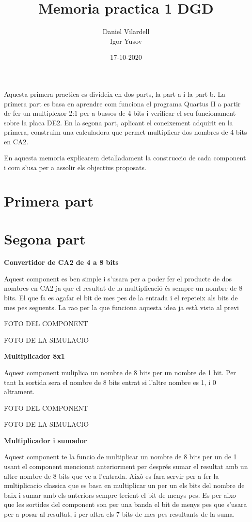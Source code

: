 \documentclass[12pt, a4papre]{article}
\author{Daniel Vilardell\\
	   Igor Yusov}
\title{Memoria practica 1 DGD}
\date{17-10-2020}
\begin{document}
	\maketitle
	Aquesta primera practica es divideix en dos parts, la part a i la part b. La primera part es basa en aprendre com funciona el programa Quartus II a partir de fer un multiplexor  2:1 per a bussos de 4 bits i verificar el seu funcionament sobre la placa DE2. En la segona part, aplicant el coneixement adquirit en la primera, construim una calculadora que permet multiplicar dos nombres de 4 bits en CA2.
	
	En aquesta memoria explicarem detalladament la construccio de cada component i com s'usa per a assolir els objectius proposats.

	\newpage
	\section{Primera part}
	
	\newpage
	\section{Segona part}
	\textbf{\large{Convertidor de CA2 de 4 a 8 bits}}
	
	Aquest component es ben simple i s'usara per a poder fer el producte de dos nombres en CA2 ja que el resultat de la multiplicació és sempre un nombre de 8 bits. El que fa es agafar el bit de mes pes de la entrada i el repeteix als bits de mes pes seguents. La rao per la que funciona aquesta idea ja està vista al previ
	
	\begin{center}
	FOTO DEL COMPONENT
	
	FOTO DE LA SIMULACIO
	\end{center}
	
	\textbf{\large{Multiplicador 8x1}}
	
	Aquest component muliplica un nombre de 8 bits per  un nombre de 1 bit. Per tant la sortida sera el nombre de 8 bits entrat si l'altre nombre es 1, i 0 altrament.
	\begin{center}
	FOTO DEL COMPONENT
	
	FOTO DE LA SIMULACIO
	\end{center}
	
	\textbf{\large{Multiplicador i sumador}}
	
	Aquest component te la funcio de multiplicar un nombre de 8 bits per un de 1 usant el component mencionat anteriorment per després sumar el resultat amb un altre nombre de 8 bits que ve a l'entrada. Això es fara servir per a fer la multiplicacio classica que es basa en multiplicar un per un els bits del nombre de baix i sumar amb els anteriors sempre treient el bit de menys pes. Es per aixo que les sortides del component son per una banda el bit de menys pes que s'usara per a posar al resultat, i per altra els 7 bits de mes pes resultants de la suma. 
	
\end{document}
